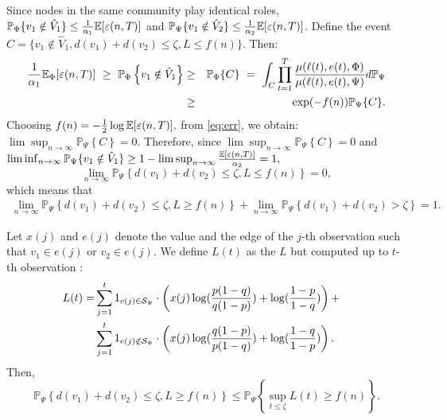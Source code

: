 Since nodes in the same community
play identical roles, $\mathbb{P}_{\Phi} \{ v_1 \notin \hat{V}_1 \}
\le \frac{1}{\alpha_1}{\mathbb E} [ \varepsilon (n,T) ]$ and $\mathbb{P}_{\Psi} \{ v_1 \notin \hat{V}_2 \} \le \frac{1}{\alpha_2} {\mathbb E} [ \varepsilon (n,T) ]$.
Define the event $C=\{  v_1 \notin \hat{V}_1, d(v_1)+d(v_2) \le \zeta,  L\le  f(n)\}$. Then:
\begin{eqnarray}
\frac{1}{\alpha_1} {\mathbb E}_{\Phi}[\varepsilon (n,T) ]~\ge~\mathbb{P}_{\Phi}\left\{v_1 \notin \hat{V}_1\right\}  &\ge& \mathbb{P}_{\Phi}  \{ C \} ~ =~  \int_{C}
\prod_{t = 1
  }^{T}\frac{\mu(\ell(t),e(t),\Phi)}{\mu(\ell(t),e(t),\Psi)}
d\mathbb{P}_{\Psi} \cr
 &\ge& \exp(-f(n)) \mathbb{P}_{\Psi} \{ C \}.\label{eq:err}
\end{eqnarray}
Choosing $f(n) = -\frac{1}{2}\log  {\mathbb E} [\varepsilon (n,T) ],$
from \eqref{eq:err}, we obtain: $\lim\sup_{n\rightarrow \infty} \mathbb{P}_{\Psi} \left\{C\right\} =0$.
Therefore, since $\lim\sup_{n\rightarrow \infty} \mathbb{P}_{\Psi}
\left\{C\right\} =0$ and  $\lim\inf_{n\rightarrow \infty}\mathbb{P}_{\Psi} \{v_1 \notin \hat{V}_1\} \ge 1-\lim\sup_{n\to\infty}\frac{{\mathbb E} [\varepsilon(n,T)]}{\alpha_2} = 1,$ 
$$
\lim_{n \rightarrow \infty }\mathbb{P}_{\Psi} \left\{ 
d(v_1)+d(v_2) \le \zeta  , L
\le  f(n)\right\} = 0,
$$
which means that
\begin{align}
\lim_{n \rightarrow \infty }\mathbb{P}_{\Psi} \left\{ 
d(v_1)+d(v_2) \le \zeta , L \ge  f(n)\right\}  + \lim_{n \rightarrow \infty }\mathbb{P}_{\Psi} \left\{ 
d(v_1)+d(v_2) > \zeta \right\} = 1 .\label{eq:dbnd1}
\end{align}

Let $x (j)$ and $e(j)$ denote the value and the edge of the $j$-th
observation such that $v_1 \in e(j)$ or $v_2 \in e(j)$. We define $L(t)$ as the $L$ but computed up to $t$-th observation :
\begin{align*}L(t) = & \sum_{j=1}^t 1_{e(j)  \in \mathcal{S}_{\Psi}} \cdot \left( x(j) \log(\frac{p(1-q)}{q(1-p)}) +
\log(\frac{1-p}{1-q}) \right)+\cr &\sum_{j=1}^t 1_{e(j)  \notin \mathcal{S}_{\Psi}} \cdot \left(x(j)
\log(\frac{q(1-p)}{p(1-q)}) +
\log(\frac{1-q}{1-p})\right).\end{align*} 
Then,
\begin{equation}\mathbb{P}_{\Psi} \left\{ d(v_1)+d(v_2) \le  \zeta   , L\ge  f(n) \right\}  \le
\mathbb{P}_{\Psi} \left\{ \sup_{t \le  \zeta } L (t)
  \ge f(n) \right\}.\label{eq:supl}\end{equation}


